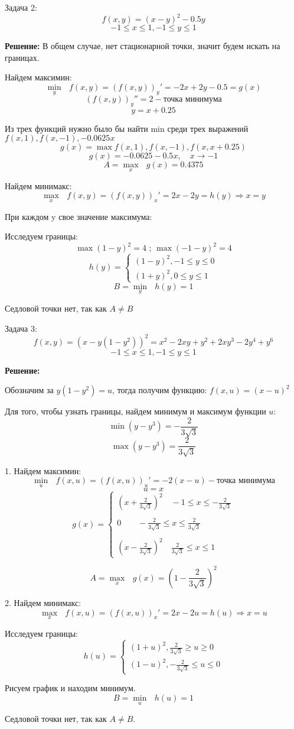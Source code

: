 \documentclass[aps,%
12pt,%
final,%
oneside,
onecolumn,%
musixtex, %
superscriptaddress,%
centertags]{article} %
\begin{document}
Задача 2:
$$ f(x,y) = (x-y)^2 - 0.5y $$
$$ -1 \leq x \leq 1,-1 \leq y \leq 1 $$

\textbf{Решение:}
В общем случае, нет стационарной точки, значит будем искать на границах.

Найдем максимин:
$$ \underset{y}{\min} \text{ } f(x,y) = (f(x,y))_y'  = -2x + 2y -0.5 = g(x)$$
$$(f(x,y))_y'' = 2  -\text{точка минимума}$$ 
$$ y = x + 0.25$$

Из трех функций нужно было бы найти min среди трех выражений $f(x,1),f(x,-1),-0.0625x$
$$g(x) = \max{f(x,1),f(x,-1),f(x,x+0.25)}$$
$$ g(x) = -0.0625 - 0.5 x,\quad  x\to -1 $$
$$ A = \underset{x}{\max} \text{ } g(x) = 0.4375 $$

Найдем минимакс:
$$ \underset{x}{\max} \text{ } f(x,y) = (f(x,y))_x'  = 2x -  2y = h(y) \Rightarrow x = y$$

При каждом y свое значение максимума:

Исследуем границы:
$$ \max (1-y)^2 = 4 \text{ ;  } \max (-1-y)^2 = 4 $$
$$h(y) = \left\{\begin{matrix}
(1-y)^2, -1 \leq y \leq 0\\ 
(1+y)^2, 0 \leq y \leq 1
\end{matrix}\right.$$
$$ B = \underset{y}{\min} \text{ } h(y) = 1 $$

Седловой точки нет, так как $A \neq B$

Задача 3:
$$ f(x,y) = (x-y(1-y^2))^2 = x^2 - 2 x y + y^2 + 2 x y^3 - 2 y^4 + y^6$$
$$ -1 \leq x \leq 1,-1 \leq y \leq 1 $$

\textbf{Решение:}

Обозначим за $y(1-y^2) = u$, тогда получим функцию: $f(x,u) = (x-u)^2$

Для того, чтобы узнать границы, найдем минимум и максимум функции $u$:
$$ \min (y - y^3) =-\frac{2}{3\sqrt3}$$
$$ \max (y - y^3) = \frac{2}{3\sqrt3}$$

1. Найдем максимин:
$$ \underset{u}{\min} \text{ } f(x,u) = (f(x,u))_u'  = -2(x-u) - \text{точка минимума}$$
$$u=x$$
$$g(x) = \left \{
\begin{matrix}
(x+\frac{2}{3\sqrt3})^2 \quad -1 \leq x \leq -\frac{2}{3\sqrt3} \\
{}\\
  0 \qquad -\frac{2}{3\sqrt3} \leq x \leq \frac{2}{3\sqrt3} \\
{} \\
(x-\frac{2}{3\sqrt3})^2 \quad \frac{2}{3\sqrt3 } \leq x \leq 1
\end{matrix}\right.$$

$$ A = \underset{x}{\max} \text{ } g(x) = \left (1 - \frac{2}{3\sqrt {3}}\right)^2$$

2. Найдем минимакс:
$$ \underset{x}{\max} \text{ } f(x,u) = (f(x,u))_x'  = 2x -  2u = h(u) \Rightarrow x = u$$

Исследуем границы:
$$h(u) = \left\{
\begin{matrix}
(1+u)^2,\frac{2}{3\sqrt{3}}\geq u \geq 0 \\ 
(1-u)^2, -\frac{2}{3\sqrt{3}}\leq u \leq 0
\end{matrix}\right.$$

Рисуем график и находим минимум.
$$ B = \underset{u}{\min} \text{ } h(u) = 1 $$

Седловой точки нет, так как $A \neq B$.
\end{document}
